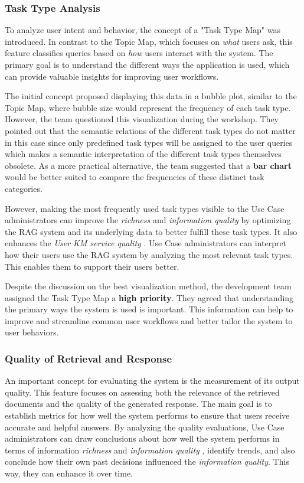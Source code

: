 \documentclass[
	english,
	ruledheaders=section,%
	class=report,%
	thesis={type=bachelor},%
	accentcolor=1b,%
	custommargins=true,%
	marginpar=false,%
	parskip=half-,%
	fontsize=11pt,%
	DIV=14,
]{tudapub}
\begin{document}
\subsubsection{Task Type Analysis}
To analyze user intent and behavior, the concept of a "Task Type Map" was introduced. In contrast to the Topic Map, which focuses on \textit{what} users ask, this feature classifies queries based on \textit{how} users interact with the system. The primary goal is to understand the different ways the application is used, which can provide valuable insights for improving user workflows.

The initial concept proposed displaying this data in a bubble plot, similar to the Topic Map, where bubble size would represent the frequency of each task type. However, the team questioned this visualization during the workshop. They pointed out that the semantic relations of the different task types do not matter in this case since only predefined task types will be assigned to the user queries which makes a semantic interpretation of the different task types themselves obsolete. As a more practical alternative, the team suggested that a \textbf{bar chart} would be better suited to compare the frequencies of these distinct task categories.

However, making the most frequently used task types visible to the Use Case administrators can improve the \textit{richness} and \textit{information quality} \parencite[pp.~57--58]{DeloneMcLean2003ISSuccessTenYearUpdate} by optimizing the RAG system and its underlying data to better fulfill these task types. It also enhances the \textit{User KM service quality} \parencite[pp.~58--59]{Jennex2006}. Use Case administrators can interpret how their users use the RAG system by analyzing the most relevant task types. This enables them to support their users better.

Despite the discussion on the best visualization method, the development team assigned the Task Type Map a \textbf{high priority}. They agreed that understanding the primary ways the system is used is important. This information can help to improve and streamline common user workflows and better tailor the system to user behaviors.
\subsubsection{Quality of Retrieval and Response}
An important concept for evaluating the system is the measurement of its output quality. This feature focuses on assessing both the relevance of the retrieved documents and the quality of the generated response. The main goal is to establish metrics for how well the system performs to ensure that users receive accurate and helpful answers. By analyzing the quality evaluations, Use Case administrators can draw conclusions about how well the system performs in terms of information \textit{richness} and \textit{information quality} \parencite[pp.~57--58]{DeloneMcLean2003ISSuccessTenYearUpdate}, identify trends, and also conclude how their own past decisions influenced the \textit{information quality}. This way, they can enhance it over time.
\end{document}
